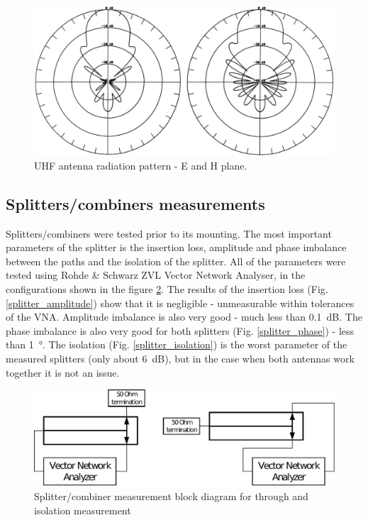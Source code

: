 \begin{figure}
    \centering
    \includegraphics[width=0.75\paperwidth]{img/5/radiation_435.png}
    \caption{UHF antenna radiation pattern - E and H plane.}
    \label{radiation_435}
\end{figure}



\subsection{Splitters/combiners measurements}
Splitters/combiners were tested prior to its mounting. The most important parameters of the splitter is the insertion loss, amplitude and phase imbalance between the paths and the isolation of the splitter. All of the parameters were tested using Rohde \& Schwarz ZVL Vector Network Analyser, in the configurations shown in the figure \ref{splitter_measurement_diagram}. The results of the insertion loss (Fig. \ref{splitter_amplitude}) show that it is negligible - unmeasurable within tolerances of the VNA. Amplitude imbalance is also very good - much less than \SI{0.1}{\dB}. The phase imbalance is also very good for both splitters (Fig. \ref{splitter_phase}) - less than \SI{1}{\degree}. The isolation (Fig. \ref{splitter_isolation}) is the worst parameter of the measured splitters (only about \SI{6}{\dB}), but in the case when both antennas work together it is not an issue.

\begin{figure}
    \centering
    \includegraphics[width=0.75\paperwidth]{img/5/splitter_measurement_diagram.pdf}
    \caption{Splitter/combiner measurement block diagram for through and isolation measurement}
    \label{splitter_measurement_diagram}
\end{figure}

